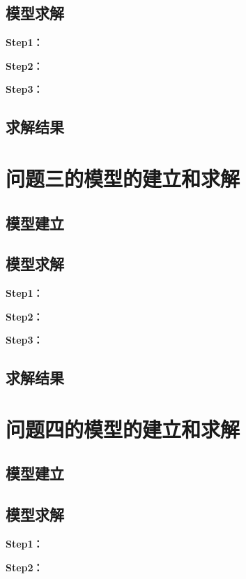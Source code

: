 \documentclass[withoutpreface,bwprint]{cumcmthesis}
\begin{document}
\subsection{模型求解}

\textbf{Step1：} 

\textbf{Step2：} 

\textbf{Step3：} 

\subsection{求解结果}


\section{问题三的模型的建立和求解}
\subsection{模型建立}

\subsection{模型求解}

\textbf{Step1：} 

\textbf{Step2：} 

\textbf{Step3：} 

\subsection{求解结果}


\section{问题四的模型的建立和求解}
\subsection{模型建立}

\subsection{模型求解}

\textbf{Step1：} 

\textbf{Step2：} 
\end{document}
